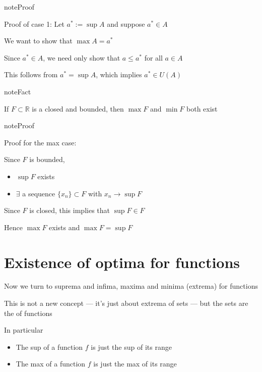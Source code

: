\documentclass[letterpaper,10pt,english]{jupyterBook}
\begin{document}
\begin{sphinxadmonition}{note}{Proof}

\sphinxAtStartPar
Proof of case 1: Let \(a^* := \sup A\) and suppose \(a^* \in A\)

\sphinxAtStartPar
We want to show that \(\max A = a^*\)

\sphinxAtStartPar
Since \(a^* \in A\), we need only show that \(a \leq a^*\) for all \(a \in A\)

\sphinxAtStartPar
This follows from \(a^* = \sup A\), which implies \(a^* \in U(A)\)
\end{sphinxadmonition}

\begin{sphinxadmonition}{note}{Fact}

\sphinxAtStartPar
If \(F \subset \mathbb{R}\) is a closed and bounded, then
\(\max F\) and \(\min F\) both exist
\end{sphinxadmonition}

\begin{sphinxadmonition}{note}{Proof}

\sphinxAtStartPar
Proof for the max case:

\sphinxAtStartPar
Since \(F\) is bounded,
\begin{itemize}
\item {} 
\sphinxAtStartPar
\(\sup F\) exists

\item {} 
\sphinxAtStartPar
\(\exists\) a sequence \(\{x_n\} \subset F\) with \(x_n \to \sup F\)

\end{itemize}

\sphinxAtStartPar
Since \(F\) is closed, this implies that \(\sup F \in F\)

\sphinxAtStartPar
Hence \(\max F\) exists and \(\max F = \sup F\)
\end{sphinxadmonition}


\section{Existence of optima for functions}
\label{\detokenize{06.optimization_fundamentals:existence-of-optima-for-functions}}
\sphinxAtStartPar
Now we turn to suprema and infima, maxima and minima (extrema) for functions

\sphinxAtStartPar
This is not a new concept — it’s just about extrema of sets — but the sets are the  of functions

\sphinxAtStartPar
In particular
\begin{itemize}
\item {} 
\sphinxAtStartPar
The sup of a function \(f\) is just the sup of its range

\item {} 
\sphinxAtStartPar
The max of a function \(f\) is just the max of its range

\end{itemize}
\end{document}
